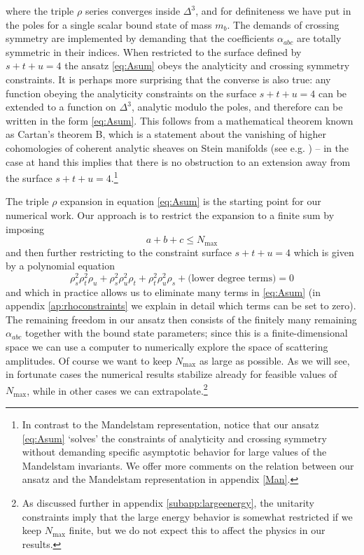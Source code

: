 \documentclass[12pt]{article}
\newcommand{\begBvR}[1]{\begin{#1}}
\newcommand{\beq}{\begBvR{equation}}
\newcommand{\eeq}{\end{equation}}
\newcommand{\<}{{\langle}}
\renewcommand{\>}{{\rangle}}
\def\a{{\alpha}}
\def\a{\alpha}
\begin{document}
where the triple $\rho$ series converges inside $\Delta^3$, and for definiteness we have put in the poles for a single scalar bound state of mass $m_b$. The demands of crossing symmetry are implemented by demanding that the coefficients $\a_{abc}$ are totally symmetric in their indices. When restricted to the surface defined by $s + t + u = 4$ the ansatz \eqref{eq:Asum} obeys the analyticity and crossing symmetry constraints. It is perhaps more surprising that the converse is also true: any function obeying the analyticity constraints on the surface $s + t + u = 4$ can be extended to a function on $\Delta^3$, analytic modulo the poles, and therefore can be written in the form \eqref{eq:Asum}. This follows from a mathematical theorem known as Cartan's theorem B, which is a statement about the vanishing of higher cohomologies of coherent analytic sheaves on Stein manifolds (see e.g. \cite{forstnerivc2011stein}) -- in the case at hand this implies that there is no obstruction to an extension away from the surface $s + t + u = 4$.\footnote{In contrast to the Mandelstam representation, notice that our ansatz \eqref{eq:Asum} `solves' the constraints of analyticity and crossing symmetry without demanding specific asymptotic behavior for large values of the Mandelstam invariants. We offer more comments on the relation between our ansatz and the Mandelstam representation in appendix \ref{Man}.}

The triple $\rho$ expansion in equation \eqref{eq:Asum} is the starting point for our numerical work. Our approach is to restrict the expansion to a finite sum by imposing
\beq
a + b + c \leq N_{\max}
\eeq
and then further restricting to the constraint surface $s + t + u = 4$ which is given by a polynomial equation
\beq
\rho_s^2 \rho_t^2 \rho_u 
+\rho_s^2 \rho_u^2 \rho_t +\rho_t^2 \rho_u^2 \rho_s + \text{(lower degree terms)} = 0
\eeq
and which in practice allows us to eliminate many terms 
in  \eqref{eq:Asum} (in appendix \ref{ap:rhoconstraints} we explain in detail which terms can be set to zero).
The remaining freedom in our ansatz then consists of the finitely many remaining $\alpha_{abc}$ together with the bound state parameters; since this is a finite-dimensional space we can use a computer to numerically explore the space of scattering amplitudes. Of course we want to keep $N_{\max}$ as large as possible. As we will see, in fortunate cases the numerical results stabilize already for feasible values of $N_{\max}$, while in other cases we can extrapolate.\footnote{As discussed further in appendix \ref{subapp:largeenergy}, the unitarity constraints imply that the large energy behavior is somewhat restricted if we keep $N_{\max}$ finite, but we do not expect this to affect the physics in our results.}
\end{document}
